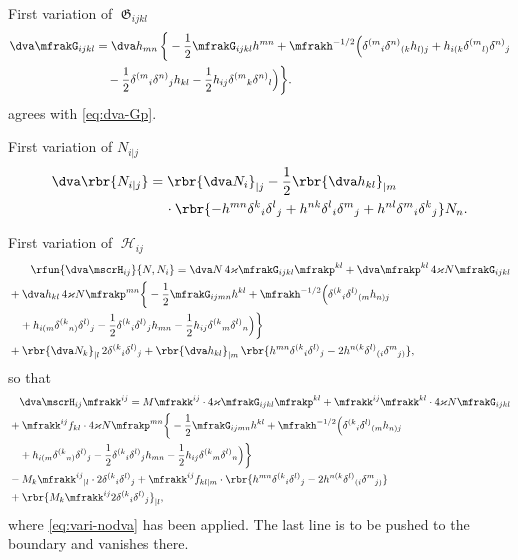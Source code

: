 \documentclass[a4paper,11pt]{article}
\begin{document}
First variation of $\mfrakG_{ijkl}$
\begin{align}
\dva \mfrakG_{ijkl} &= \dva h_{mn}\,\bigg\{-\frac{1}{2}\mfrakG_{ijkl} h^{mn}
+ \mfrakh^{-1/2} \Big(
\delta^{(m}{}_{i} \delta^{n)}{}_{(k} h_{l)j} +
h_{i(k} \delta^{(m}{}_{l)} \delta^{n)}{}_{j}
\nonumber \\
&\quad -
\frac{1}{2} \delta^{(m}{}_{i} \delta^{n)}{}_{j} h_{kl} - \frac{1}{2}
h_{ij} \delta^{(m}{}_{k} \delta^{n)}{}_{l} \Big)
\bigg\}.
\label{eq:dva-G}
\end{align}
 agrees with \cref{eq:dva-Gp}.

First variation of $N_{i|j}$
\begin{align}
\dva \rbr{N_{i|j}} &=
\rbr{\dva N_{i}}_{|j} -
\frac{1}{2} \rbr{\dva h_{kl}}_{|m}
\nonumber \\
&\quad\,\cdot \rbr{
- h^{mn} \delta^{k}{}_{i} \delta^{l}{}_{j}
+ h^{nk} \delta^{l}{}_{i} \delta^{m}{}_{j}
+ h^{nl} \delta^{m}{}_{i} \delta^{k}{}_{j}} N_n.
\end{align}

First variation of $\mscrH_{ij}$
\begin{align}
&\qquad
\rfun{\dva\mscrH_{ij}}{N, N_i} = \dva 
N\,4\varkappa\mfrakG_{ijkl}\mfrakp^{kl}
+ \dva\mfrakp^{kl}\,4\varkappa N \mfrakG_{ijkl}
\nonumber \\
&+
\dva h_{kl}\,4\varkappa N \mfrakp^{mn}
\bigg\{-\frac{1}{2}\mfrakG_{ijmn}h^{kl} 
+ \mfrakh^{-1/2} \Big(
\delta^{(k}{}_{i} \delta^{l)}{}_{(m} h_{n)j} 
\nonumber \\
&\quad +
h_{i(m} \delta^{(k}{}_{n)} \delta^{l)}{}_{j} - \frac{1}{2}
\delta^{(k}{}_{i} \delta^{l)}{}_{j} h_{mn} - \frac{1}{2}
h_{ij} \delta^{(k}{}_{m} \delta^{l)}{}_{n} \Big)\bigg\}
\nonumber \\
& +
\rbr{\dva N_k}_{|l}\, 2 \delta^{(k}{}_{i}\delta^{l)}{}_{j} +
\rbr{\dva h_{kl}}_{|m}\, \rbr{
h^{mn} \delta^{(k}{}_{i} \delta^{l)}{}_{j} - 2
h^{n(k} \delta^{l)}{}_{(i} \delta^{m}{}_{j)}},
\end{align}
so that
\begin{align}
&\quad\dva \mscrH_{ij} \mfrakk^{ij} =
M \mfrakk^{ij}\cdot 4\varkappa \mfrakG_{ijkl} \mfrakp^{kl} +
\mfrakk^{ij} \mfrakk^{kl}\cdot 4\varkappa N \mfrakG_{ijkl}
\nonumber \\
& +
\mfrakk^{ij} f_{kl}\cdot 4\varkappa N \mfrakp^{mn}
\bigg\{-\frac{1}{2}\mfrakG_{ijmn}h^{kl} 
+ \mfrakh^{-1/2} \Big(
\delta^{(k}{}_{i} \delta^{l)}{}_{(m} h_{n)j}
\nonumber \\
&\quad +
h_{i(m} \delta^{(k}{}_{n)} \delta^{l)}{}_{j} - \frac{1}{2}
\delta^{(k}{}_{i} \delta^{l)}{}_{j} h_{mn} - \frac{1}{2}
h_{ij} \delta^{(k}{}_{m} \delta^{l)}{}_{n} \Big)\bigg\}
\nonumber \\
& -
M_k \mfrakk^{ij}{}_{|l}\cdot 2\delta^{(k}{}_{i}\delta^{l)}{}_{j}
+ \mfrakk^{ij} f_{kl|m}\cdot\rbr{
h^{mn} \delta^{(k}{}_{i} \delta^{l)}{}_{j} - 2
h^{n(k} \delta^{l)}{}_{(i} \delta^{m}{}_{j)}}
\nonumber \\
& +
\rbr{M_k \mfrakk^{ij}2\delta^{(k}{}_{i}\delta^{l)}{}_{j}}_{|l},
\end{align}
where \cref{eq:vari-nodva} has been applied. The last line is to be pushed to 
the boundary and vanishes there.
\end{document}
